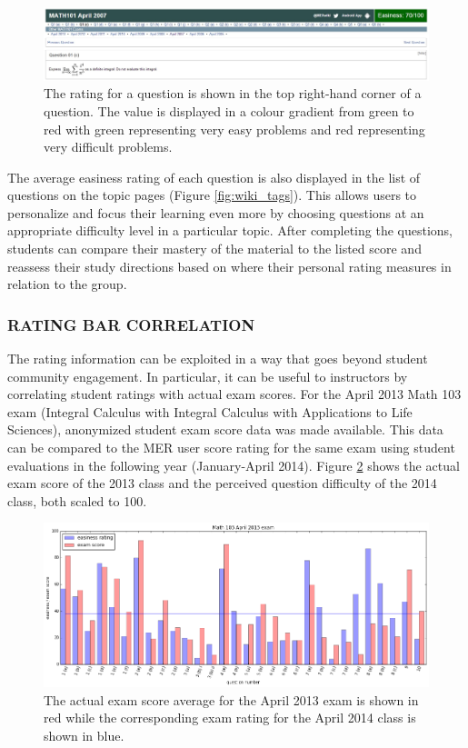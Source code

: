 \documentclass{primus}
\begin{document}
\begin{figure}[H]
\centering
\includegraphics[width=\textwidth]{figs/easiness_rating.jpg}
\caption{The rating for a question is shown in the top right-hand corner of a question. The value is displayed in a colour gradient from green to red with green representing very easy problems and red representing very difficult problems.}\label{fig:Rating_bar}
\end{figure}

\noindent{}The average easiness rating of each question is also displayed in the list of questions on the topic pages (Figure \ref{fig:wiki_tags}). This allows users to personalize and focus their learning even more by choosing questions at an appropriate difficulty level in a particular topic. After completing the questions, students can compare their mastery of the material to the listed score and reassess their study directions based on where their personal rating measures in relation to the group.

\subsubsection{RATING BAR CORRELATION}\label{sec:correlation}
The rating information can be exploited in a way that goes beyond student community engagement.  In particular, it can be useful to instructors by correlating student ratings with actual exam scores.  For the April 2013 Math 103 exam (Integral Calculus with Integral Calculus with Applications to Life Sciences), anonymized student exam score data was made available.  This data can be compared to the MER user score rating for the same exam using student evaluations in the following year (January-April 2014).  Figure \ref{fig:score_compare} shows the actual exam score of the 2013 class and the perceived question difficulty of the 2014 class, both scaled to 100.

\begin{figure}[H]
\centering
\includegraphics[width=\textwidth]{figs/score_compare.png}
\caption{The actual exam score average for the April 2013 exam is shown in red while the corresponding exam rating for the April 2014 class is shown in blue.}\label{fig:score_compare}
\end{figure}
\end{document}
